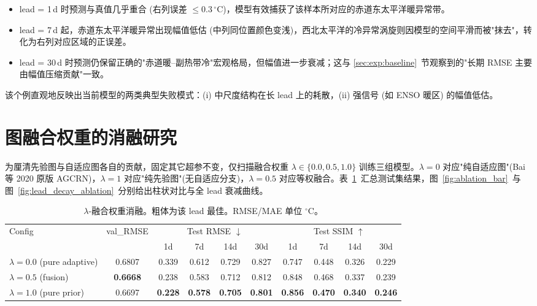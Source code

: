 \begin{itemize}
    \item lead = 1\,d 时预测与真值几乎重合 (右列误差 $\le\!0.3\,^{\circ}$C)，模型有效捕获了该样本所对应的赤道东太平洋暖异常带。
    \item lead = 7\,d 起，赤道东太平洋暖异常出现幅值低估 (中列同位置颜色变浅)，西北太平洋的冷异常涡旋则因模型的空间平滑而被"抹去"，转化为右列对应区域的正误差。
    \item lead = 30\,d 时预测仍保留正确的"赤道暖--副热带冷"宏观格局，但幅值进一步衰减；这与 \ref{sec:exp:baseline}~节观察到的"长期 RMSE 主要由幅值压缩贡献"一致。
\end{itemize}
该个例直观地反映出当前模型的两类典型失败模式：(i) 中尺度结构在长 lead 上的耗散，(ii) 强信号 (如 ENSO 暖区) 的幅值低估。

\section{图融合权重的消融研究}
\label{sec:exp:ablation}

为厘清先验图与自适应图各自的贡献，固定其它超参不变，仅扫描融合权重 $\lambda \in \{0.0, 0.5, 1.0\}$ 训练三组模型。$\lambda = 0$ 对应"纯自适应图"(Bai 等 2020 原版 AGCRN)，$\lambda = 1$ 对应"纯先验图"(无自适应分支)，$\lambda = 0.5$ 对应等权融合。表~\ref{tab:ablation}~汇总测试集结果，图~\ref{fig:ablation_bar}~与图~\ref{fig:lead_decay_ablation}~分别给出柱状对比与全 lead 衰减曲线。

\begin{table}[ht]
\centering
\caption{$\lambda$-融合权重消融。粗体为该 lead 最佳。RMSE/MAE 单位 $^{\circ}$C。}
\label{tab:ablation}
\small
\begin{tabular}{l|c|cccc|cccc}
\hline
\multirow{2}{*}{Config} & \multirow{2}{*}{val\_RMSE} & \multicolumn{4}{c|}{Test RMSE $\downarrow$} & \multicolumn{4}{c}{Test SSIM $\uparrow$} \\
        &       & 1d & 7d & 14d & 30d & 1d & 7d & 14d & 30d \\
\hline
$\lambda=0.0$ (pure adaptive)  & 0.6807 & 0.339 & 0.612 & 0.729 & 0.827 & 0.747 & 0.448 & 0.326 & 0.229 \\
$\lambda=0.5$ (fusion)         & \textbf{0.6668} & 0.238 & 0.583 & 0.712 & 0.812 & 0.848 & 0.468 & 0.337 & 0.239 \\
$\lambda=1.0$ (pure prior)     & 0.6697 & \textbf{0.228} & \textbf{0.578} & \textbf{0.705} & \textbf{0.801} & \textbf{0.856} & \textbf{0.470} & \textbf{0.340} & \textbf{0.246} \\
\hline
\end{tabular}
\end{table}

